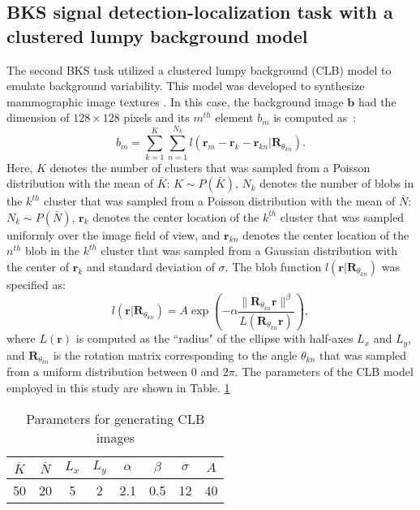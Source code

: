 \documentclass[journal]{IEEEtran}
\renewcommand{\vec}[1]{\mathbf{#1}}
\begin{document}
\subsection{BKS signal detection-localization task with a clustered lumpy background model}
 The second BKS task utilized a clustered lumpy background (CLB) model to emulate
background variability.  This model was developed  to synthesize mammographic image textures \cite{bochud1999statistical}. 
In this case, the background image $\vec{b}$ had the dimension of $128\times 128$ pixels and its $m^{th}$ element $b_m$ is computed as~\cite{bochud1999statistical}:
\begin{equation}
b_m = \sum_{k=1}^{K}\sum_{n=1}^{N_k} l\left(\vec{r}_m - \vec{r}_k - \vec{r}_{kn}| \mathbf{R}_{\theta_{kn}}\right).
\end{equation} 
Here, $K$ denotes the number of clusters that was sampled from a Poisson distribution with the mean of $\bar{K}$:  $K\sim P(\bar{K})$, $N_k$ denotes the number of blobs in the $k^{th}$ cluster that was sampled from a Poisson distribution with the mean of $\bar{N}$: $N_k\sim P(\bar{N})$,
$\vec{r}_k$ denotes the center location of the $k^{th}$ cluster that was sampled uniformly over 
the image field of view, and
$\vec{r}_{kn}$ denotes the center location of the $n^{th}$ blob in the $k^{th}$ cluster that was sampled from a Gaussian distribution with the center of $\vec{r}_k$ and standard deviation of $\sigma$. 
The blob function $l\left(\vec{r}| \mathbf{R}_{\theta_{kn}}\right)$ was specified as:
\begin{equation}
l\left(\vec{r}|\mathbf{R}_{\theta_{kn}}\right) = A\exp\left(-\alpha \frac{\|\mathbf{R}_{\theta_{kn}} \vec{r}\|^\beta}{L(\mathbf{R}_{\theta_{kn}}\vec{r})} \right),
\end{equation}
where $L(\vec{r})$ is computed as the ``radius" of the ellipse with half-axes $L_x$ and $L_y$, and $\mathbf{R}_{\theta_{kn}}$ is the rotation matrix corresponding to the angle $\theta_{kn}$ that was sampled 
from a uniform distribution between 0 and $2\pi$.
 The parameters of the CLB model employed in this study  are shown in Table. \ref{table1}
\renewcommand{\arraystretch}{1.5}
\begin{table}[H]
\centering
\caption{Parameters for generating CLB images}
\begin{tabular}{| c | c | c | c | c | c | c | c |}
\hline
{$\overline{{K}}$} & $\overline{{N}}$ & $L_x$ & $L_y$ & $\alpha$ & $\beta$ & $\sigma$ & $A$\\ \hline
                       50  & 20  & 5  & 2   & 2.1  & 0.5 & 12 & 40   \\ \hline
\end{tabular}
\label{table1}
\end{table}
\end{document}
